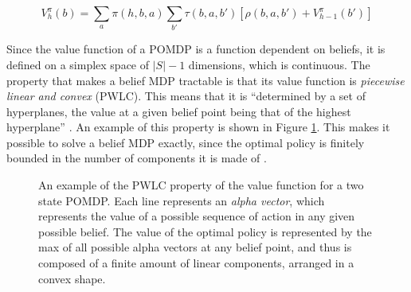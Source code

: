 \begin{equation}
 V^{\pi}_{h}(b) = \sum_a \pi(h, b, a) \sum_{b'} \tau(b, a, b') \left [ \rho(b, a, b') +
V^{\pi}_{h-1}(b') \right ]
\end{equation}

Since the value function of a POMDP is a function dependent on beliefs, it is defined on a simplex
space of $|S|-1$ dimensions, which is continuous. The property that makes a belief MDP tractable is
that its value function is \textit{piecewise linear and convex} (PWLC).  This means that it is
``determined by a set of hyperplanes, the value at a given belief point being that of the highest
hyperplane'' \cite{cit:rpomdp}. An example of this property is shown in Figure \ref{pwlcpic}. This
makes it possible to solve a belief MDP exactly, since the optimal policy is finitely bounded in the
number of components it is made of \cite{cit:pomdp}.

\begin{figure}[ht]
\begin{center}
\end{center}
\caption{An example of the PWLC property of the value function for a two state POMDP. Each line
represents an \textit{alpha vector}, which represents the value of a possible sequence of action in
any given possible belief. The value of the optimal policy is represented by the max of all possible
alpha vectors at any belief point, and thus is composed of a finite amount of linear components,
arranged in a convex shape.}
\label{pwlcpic}
\end{figure}


